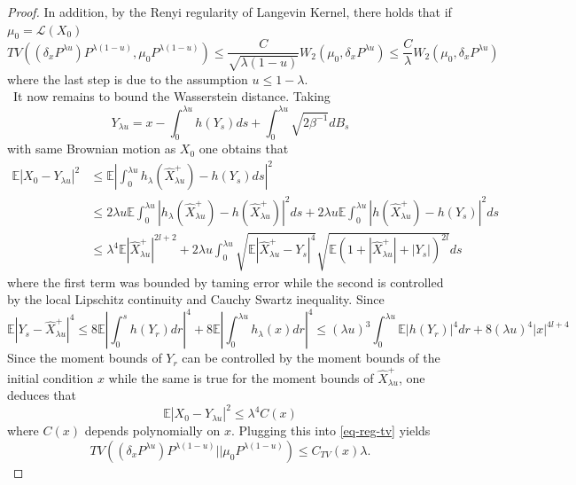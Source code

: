 \documentclass[11pt,a4paper,reqno]{amsart}
\theoremstyle{plain}
\theoremstyle{definition}
\theoremstyle{remark}
\newcommand{\E}{\mathbb{E}}
\begin{document}
\begin{proof}
 In addition, by the Renyi regularity of Langevin Kernel, there holds that if $\mu_0=\mathcal{L}(X_0)$
 \begin{equation}\label{eq-reg-tv}
     TV ((\delta_xP^{\lambda u}) P^{\lambda (1-u)},\mu_0 P^{\lambda (1-u)})\leq \frac{C}{\sqrt{\lambda (1-u)}} W_2 (\mu_0,\delta_xP^{\lambda u})\leq \frac{C}{\lambda} W_2 (\mu_0,\delta_xP^{\lambda u})
 \end{equation}
 where the last step is due to the assumption $u\leq 1-\lambda.$\\\
 It now remains to bound the Wasserstein distance.
 Taking \[Y_{\lambda u}= x- \int_0^{\lambda u }h(Y_s) ds + \int_0^{\lambda u }\sqrt{2\beta^{-1}} dB_s \] with same Brownian motion as $X_0$ one obtains that 
 \[\begin{aligned}
     \E |X_0-Y_{\lambda u}|^2&\leq  \E |\int_0 ^{\lambda u} h_\lambda (\hat{X}^{+}_{\lambda u})-h(Y_s) ds|^2 \\&\leq  2 \lambda u \E \int_0 ^{\lambda u}| h_\lambda (\hat{X}^{+}_{\lambda u})-h(\hat{X}^{+}_{\lambda u})|^2 ds + 2 \lambda u \E \int_0 ^{\lambda u}| h (\hat{X}^{+}_{\lambda u})-h(Y_s)|^2 ds
     \\&\leq 
     \lambda^4 \E |\hat{X}^{+}_{\lambda u}|^{2l+2} + 2\lambda u \int_0^{\lambda u} \sqrt{\E |\hat{X}^{+}_{\lambda u}-Y_s|^4} \sqrt{\E (1+|\hat{X}^{+}_{\lambda u}|+ |Y_s|)^{2l}}ds \end{aligned}\]
     where the first term was bounded by taming error while the second is controlled by the local Lipschitz continuity and Cauchy Swartz inequality.
     Since \[\E |Y_s-\hat{X}^{+}_{\lambda u}|^4\leq 8 \E | \int_0^s h(Y_r)dr|^4 + 8 \E |\int_0^{\lambda u} h_\lambda (x)dr|^4\leq (\lambda u)^3 \int_0^{\lambda u} \E |h(Y_r)|^4 dr + 8 (\lambda u)^4 |x|^{4l+4}\]
     Since the moment bounds of $Y_r$ can be controlled by the moment bounds of the initial condition $x$ while the same is true for the moment bounds of $\hat{X}^{+}_{\lambda u}$, one deduces that 
    \[ \E |X_0-Y_{\lambda u}|^2\leq \lambda^4 C(x)\] where $C(x)$ depends polynomially on $x.$
   Plugging this into  \eqref{eq-reg-tv} yields
   \[TV ((\delta_xP^{\lambda u}) P^{\lambda (1-u)}|| \mu_0 P^{\lambda (1-u)})\leq C_{TV}(x)\lambda.\]

\end{proof}
\end{document}
